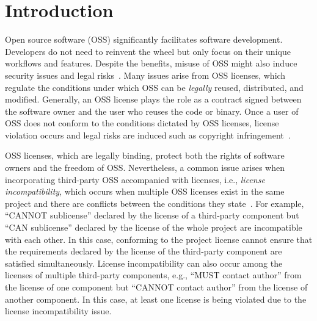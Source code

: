 \section{Introduction}
Open source software (OSS) significantly facilitates software development. Developers do not need to reinvent the wheel but only focus on their unique workflows and features. Despite the benefits, misuse of OSS might also induce security issues and legal risks~\cite{licensing2004software,infringement-case,chinacase,infringement-case2,liu2022demystifying}. Many issues arise from OSS licenses, which regulate the conditions under which OSS can be \textit{legally} reused, distributed, and modified. Generally, an OSS license plays the role as a contract signed between the software owner and the user who reuses the code or binary. Once a user of OSS does not conform to the conditions dictated by OSS licenses, license violation occurs and legal risks are induced such as copyright infringement~\cite{infringement-case3}. 

OSS licenses, which are legally binding, protect both the rights of software owners and the freedom of OSS.
Nevertheless, a common issue arises when incorporating third-party OSS accompanied with licenses, i.e., \textit{license incompatibility}, which occurs when multiple OSS licenses exist in the same project and there are conflicts between the conditions they state~\cite{gangadharan2012managing,jss`17-Kapitsaki-SPDX}. For example, ``CANNOT sublicense'' declared by the license of a third-party component but ``CAN sublicense'' declared by the license of the whole project {are incompatible with each other}. In this case, conforming to the project license cannot ensure that the requirements declared by the license of the third-party component are satisfied simultaneously. License incompatibility can also occur among the licenses of multiple third-party components, 
{e.g.,} ``MUST contact author'' from the license of one component but ``CANNOT contact author'' from the license of another component. In this case, at least one license is being violated due to the license incompatibility issue.

